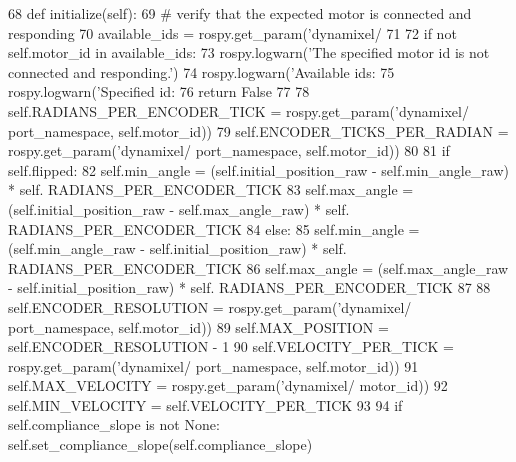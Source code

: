 \begin{DoxyCode}
68     \textcolor{keyword}{def }initialize(self):
69         \textcolor{comment}{# verify that the expected motor is connected and responding}
70         available\_ids = rospy.get\_param(\textcolor{stringliteral}{'dynamixel/%
71         
72         \textcolor{keywordflow}{if} \textcolor{keywordflow}{not} self.motor\_id \textcolor{keywordflow}{in} available\_ids:
73             rospy.logwarn(\textcolor{stringliteral}{'The specified motor id is not connected and responding.'})
74             rospy.logwarn(\textcolor{stringliteral}{'Available ids: %
75             rospy.logwarn(\textcolor{stringliteral}{'Specified id: %
76             \textcolor{keywordflow}{return} \textcolor{keyword}{False}
77             
78         self.RADIANS\_PER\_ENCODER\_TICK = rospy.get\_param(\textcolor{stringliteral}{'dynamixel/%
      port\_namespace, self.motor\_id))
79         self.ENCODER\_TICKS\_PER\_RADIAN = rospy.get\_param(\textcolor{stringliteral}{'dynamixel/%
      port\_namespace, self.motor\_id))
80         
81         \textcolor{keywordflow}{if} self.flipped:
82             self.min\_angle = (self.initial\_position\_raw - self.min\_angle\_raw) * self.
      RADIANS\_PER\_ENCODER\_TICK
83             self.max\_angle = (self.initial\_position\_raw - self.max\_angle\_raw) * self.
      RADIANS\_PER\_ENCODER\_TICK
84         \textcolor{keywordflow}{else}:
85             self.min\_angle = (self.min\_angle\_raw - self.initial\_position\_raw) * self.
      RADIANS\_PER\_ENCODER\_TICK
86             self.max\_angle = (self.max\_angle\_raw - self.initial\_position\_raw) * self.
      RADIANS\_PER\_ENCODER\_TICK
87             
88         self.ENCODER\_RESOLUTION = rospy.get\_param(\textcolor{stringliteral}{'dynamixel/%
      port\_namespace, self.motor\_id))
89         self.MAX\_POSITION = self.ENCODER\_RESOLUTION - 1
90         self.VELOCITY\_PER\_TICK = rospy.get\_param(\textcolor{stringliteral}{'dynamixel/%
      port\_namespace, self.motor\_id))
91         self.MAX\_VELOCITY = rospy.get\_param(\textcolor{stringliteral}{'dynamixel/%
      motor\_id))
92         self.MIN\_VELOCITY = self.VELOCITY\_PER\_TICK
93         
94         \textcolor{keywordflow}{if} self.compliance\_slope \textcolor{keywordflow}{is} \textcolor{keywordflow}{not} \textcolor{keywordtype}{None}: self.set\_compliance\_slope(self.compliance\_slope)
}}}}}}}}
\end{DoxyCode}
